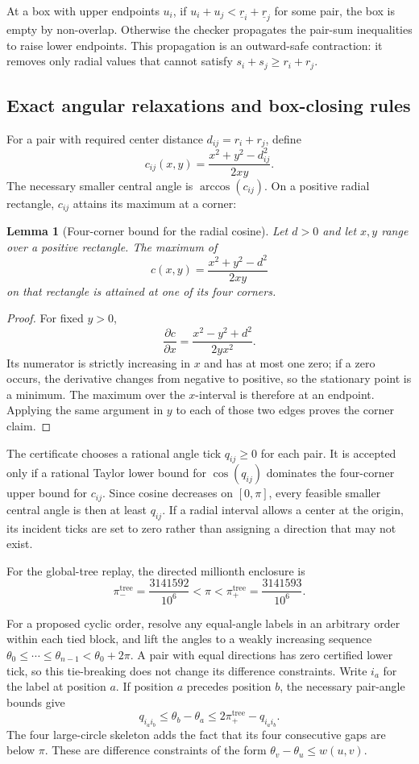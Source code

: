 \documentclass[11pt,a4paper]{article}
\newtheorem{lemma}[theorem]{Lemma}
\theoremstyle{remark}
\begin{document}
At a box with upper endpoints $u_i$, if
$u_i+u_j<\underline r_i+\underline r_j$ for some pair, the box is empty by
non-overlap.  Otherwise the checker propagates the pair-sum inequalities to
raise lower endpoints.  This propagation is an outward-safe contraction:
it removes only radial values that cannot satisfy
$s_i+s_j\ge r_i+r_j$.

\subsection{Exact angular relaxations and box-closing rules}
\label{sec:box-rules}

For a pair with required center distance $d_{ij}=r_i+r_j$, define
\[
  c_{ij}(x,y)=\frac{x^2+y^2-d_{ij}^2}{2xy}.
\]
The necessary smaller central angle is $\arccos(c_{ij})$.  On a positive
radial rectangle, $c_{ij}$ attains its maximum at a corner:

\begin{lemma}[Four-corner bound for the radial cosine]
\label{lem:corner-bound}
Let $d>0$ and let $x,y$ range over a positive rectangle.  The maximum of
\[
  c(x,y)=\frac{x^2+y^2-d^2}{2xy}
\]
on that rectangle is attained at one of its four corners.
\end{lemma}

\begin{proof}
For fixed $y>0$,
\[
  \frac{\partial c}{\partial x}
   =\frac{x^2-y^2+d^2}{2yx^2}.
\]
Its numerator is strictly increasing in $x$ and has at most one zero; if a
zero occurs, the derivative changes from negative to positive, so the
stationary point is a minimum.  The maximum over the $x$-interval is
therefore at an endpoint.  Applying the same argument in $y$ to each of
those two edges proves the corner claim.
\end{proof}

The certificate chooses a rational angle tick $q_{ij}\ge0$ for each pair.
It is accepted only if a rational Taylor lower bound for $\cos(q_{ij})$
dominates the four-corner upper bound for $c_{ij}$.  Since cosine decreases
on $[0,\pi]$, every feasible smaller central angle is then at least
$q_{ij}$.  If a radial interval allows a center at the origin, its incident
ticks are set to zero rather than assigning a direction that may not exist.

For the global-tree replay, the directed millionth enclosure is
\[
  \pi_-^{\mathrm{tree}}=\frac{3141592}{10^6}
  <\pi<
  \pi_+^{\mathrm{tree}}=\frac{3141593}{10^6}.
\]

For a proposed cyclic order, resolve any equal-angle labels in an arbitrary
order within each tied block, and lift the angles to a weakly increasing
sequence $\theta_0\le\cdots\le\theta_{n-1}<\theta_0+2\pi$.  A pair with
equal directions has zero certified lower tick, so this tie-breaking does
not change its difference constraints.  Write $i_a$ for the label at
position $a$.  If position $a$ precedes position $b$, the necessary
pair-angle bounds give
\[
  q_{i_a i_b}\le\theta_b-\theta_a
      \le2\pi_+^{\mathrm{tree}}-q_{i_a i_b}.
\]
The four large-circle skeleton adds the fact that its four consecutive gaps
are below $\pi$.  These are difference constraints of the form
$\theta_v-\theta_u\le w(u,v)$.
\end{document}

